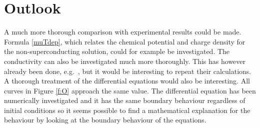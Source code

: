 \documentclass[12pt]{report}
\begin{document}
\section{Outlook}
A much more thorough comparison with experimental results could be made. Formula \eqref{muTdep}, which relates the chemical potential and charge density for the non-superconducting solution, could for example be investigated. The conductivity can also be investigated much more thoroughly. This has however already been done, e.g.~\cite{hartnoll8}, but it would be interesting to repeat their calculations. A thorough treatment of the differential equations would also be interesting. All curves in Figure \ref{f:O} approach the same value. The differential equation has been numerically investigated and it has the same boundary behaviour regardless of initial conditions so it seems possible to find a mathematical explanation for the behaviour by looking at the boundary behaviour of the equations.\\
\end{document}
